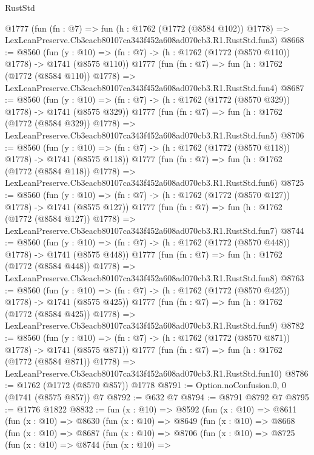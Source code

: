 \begin{lexlean}{RustStd}
\begin{coremodule}
    @1777
    (fun (fn : @7) =>
    fun (h : @1762 (@1772 (@8584 @102)) @1778) =>
    LexLeanPreserve.Cb3eacb80107ca343f452a608ad070cb3.R1.RustStd.fun3)
@8668 := @8560
    (fun (y : @10) => (fn : @7) -> (h : @1762 (@1772 (@8570 @110)) @1778) -> @1741 (@8575 @110))
    @1777
    (fun (fn : @7) =>
    fun (h : @1762 (@1772 (@8584 @110)) @1778) =>
    LexLeanPreserve.Cb3eacb80107ca343f452a608ad070cb3.R1.RustStd.fun4)
@8687 := @8560
    (fun (y : @10) => (fn : @7) -> (h : @1762 (@1772 (@8570 @329)) @1778) -> @1741 (@8575 @329))
    @1777
    (fun (fn : @7) =>
    fun (h : @1762 (@1772 (@8584 @329)) @1778) =>
    LexLeanPreserve.Cb3eacb80107ca343f452a608ad070cb3.R1.RustStd.fun5)
@8706 := @8560
    (fun (y : @10) => (fn : @7) -> (h : @1762 (@1772 (@8570 @118)) @1778) -> @1741 (@8575 @118))
    @1777
    (fun (fn : @7) =>
    fun (h : @1762 (@1772 (@8584 @118)) @1778) =>
    LexLeanPreserve.Cb3eacb80107ca343f452a608ad070cb3.R1.RustStd.fun6)
@8725 := @8560
    (fun (y : @10) => (fn : @7) -> (h : @1762 (@1772 (@8570 @127)) @1778) -> @1741 (@8575 @127))
    @1777
    (fun (fn : @7) =>
    fun (h : @1762 (@1772 (@8584 @127)) @1778) =>
    LexLeanPreserve.Cb3eacb80107ca343f452a608ad070cb3.R1.RustStd.fun7)
@8744 := @8560
    (fun (y : @10) => (fn : @7) -> (h : @1762 (@1772 (@8570 @448)) @1778) -> @1741 (@8575 @448))
    @1777
    (fun (fn : @7) =>
    fun (h : @1762 (@1772 (@8584 @448)) @1778) =>
    LexLeanPreserve.Cb3eacb80107ca343f452a608ad070cb3.R1.RustStd.fun8)
@8763 := @8560
    (fun (y : @10) => (fn : @7) -> (h : @1762 (@1772 (@8570 @425)) @1778) -> @1741 (@8575 @425))
    @1777
    (fun (fn : @7) =>
    fun (h : @1762 (@1772 (@8584 @425)) @1778) =>
    LexLeanPreserve.Cb3eacb80107ca343f452a608ad070cb3.R1.RustStd.fun9)
@8782 := @8560
    (fun (y : @10) => (fn : @7) -> (h : @1762 (@1772 (@8570 @871)) @1778) -> @1741 (@8575 @871))
    @1777
    (fun (fn : @7) =>
    fun (h : @1762 (@1772 (@8584 @871)) @1778) =>
    LexLeanPreserve.Cb3eacb80107ca343f452a608ad070cb3.R1.RustStd.fun10)
@8786 := @1762 (@1772 (@8570 @857)) @1778
@8791 := Option.noConfusion.{0, 0} (@1741 (@8575 @857)) @7
@8792 := @632 @7
@8794 := @8791 @8792 @7
@8795 := @1776 @1822
@8832 := fun (x : @10) =>
  @8592
    (fun (x : @10) =>
    @8611
      (fun (x : @10) =>
      @8630
        (fun (x : @10) =>
        @8649
          (fun (x : @10) =>
          @8668
            (fun (x : @10) =>
            @8687
              (fun (x : @10) =>
              @8706
                (fun (x : @10) =>
                @8725
                  (fun (x : @10) =>
                  @8744
                    (fun (x : @10) =>

\end{coremodule}
\end{lexlean}
